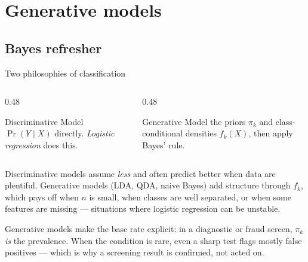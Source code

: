\documentclass[aspectratio=169,11pt]{beamer}
\begin{document}
\section{Generative models}
\subsection{Bayes refresher}

\begin{frame}{Two philosophies of classification}
  \begin{columns}[T]
    \begin{column}{0.48\textwidth}
      \begin{block}{Discriminative}
        Model $\Pr(Y \mid X)$ directly. \emph{Logistic regression}
        does this.
      \end{block}
    \end{column}
    \begin{column}{0.48\textwidth}
      \begin{block}{Generative}
        Model the priors $\pi_k$ and class-conditional densities
        $f_k(X)$, then apply Bayes' rule.
      \end{block}
    \end{column}
  \end{columns}
  \begin{takeaway}
    Discriminative models assume \emph{less} and often predict better
    when data are plentiful. Generative models (LDA, QDA, naive Bayes)
    add structure through $f_k$, which pays off when $n$ is small, when
    classes are well separated, or when some features are missing ---
    situations where logistic regression can be unstable.
  \end{takeaway}
  \begin{industry}
    Generative models make the base rate explicit: in a diagnostic or fraud
    screen, $\pi_k$ \emph{is} the prevalence. When the condition is rare, even a
    sharp test flags mostly false positives --- which is why a screening result is
    confirmed, not acted on.
  \end{industry}
\end{frame}
\end{document}
